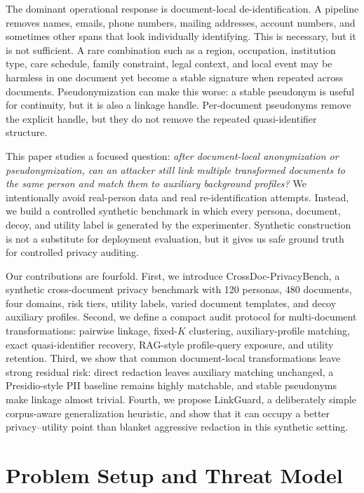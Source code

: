 \documentclass{article}
\newcommand{\method}{LinkGuard}
\newcommand{\bench}{CrossDoc-PrivacyBench}
\begin{document}
The dominant operational response is document-local de-identification.
A pipeline removes names, emails, phone numbers, mailing addresses, account numbers, and sometimes other spans that look individually identifying.
This is necessary, but it is not sufficient.
A rare combination such as a region, occupation, institution type, care schedule, family constraint, legal context, and local event may be harmless in one document yet become a stable signature when repeated across documents.
Pseudonymization can make this worse: a stable pseudonym is useful for continuity, but it is also a linkage handle.
Per-document pseudonyms remove the explicit handle, but they do not remove the repeated quasi-identifier structure.

This paper studies a focused question:
\emph{after document-local anonymization or pseudonymization, can an attacker still link multiple transformed documents to the same person and match them to auxiliary background profiles?}
We intentionally avoid real-person data and real re-identification attempts.
Instead, we build a controlled synthetic benchmark in which every persona, document, decoy, and utility label is generated by the experimenter.
Synthetic construction is not a substitute for deployment evaluation, but it gives us safe ground truth for controlled privacy auditing.

Our contributions are fourfold.
First, we introduce \bench, a synthetic cross-document privacy benchmark with 120 personas, 480 documents, four domains, risk tiers, utility labels, varied document templates, and decoy auxiliary profiles.
Second, we define a compact audit protocol for multi-document transformations: pairwise linkage, fixed-$K$ clustering, auxiliary-profile matching, exact quasi-identifier recovery, RAG-style profile-query exposure, and utility retention.
Third, we show that common document-local transformations leave strong residual risk: direct redaction leaves auxiliary matching unchanged, a Presidio-style PII baseline remains highly matchable, and stable pseudonyms make linkage almost trivial.
Fourth, we propose \method, a deliberately simple corpus-aware generalization heuristic, and show that it can occupy a better privacy--utility point than blanket aggressive redaction in this synthetic setting.

\section{Problem Setup and Threat Model}
\end{document}
